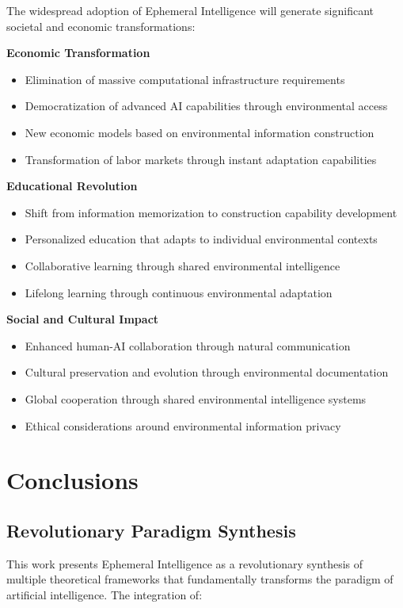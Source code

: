 \documentclass[12pt,a4paper]{article}
\begin{document}
The widespread adoption of Ephemeral Intelligence will generate significant societal and economic transformations:

\textbf{Economic Transformation}
\begin{itemize}
\item Elimination of massive computational infrastructure requirements
\item Democratization of advanced AI capabilities through environmental access
\item New economic models based on environmental information construction
\item Transformation of labor markets through instant adaptation capabilities
\end{itemize}

\textbf{Educational Revolution}
\begin{itemize}
\item Shift from information memorization to construction capability development
\item Personalized education that adapts to individual environmental contexts
\item Collaborative learning through shared environmental intelligence
\item Lifelong learning through continuous environmental adaptation
\end{itemize}

\textbf{Social and Cultural Impact}
\begin{itemize}
\item Enhanced human-AI collaboration through natural communication
\item Cultural preservation and evolution through environmental documentation
\item Global cooperation through shared environmental intelligence systems
\item Ethical considerations around environmental information privacy
\end{itemize}

\section{Conclusions}

\subsection{Revolutionary Paradigm Synthesis}

This work presents Ephemeral Intelligence as a revolutionary synthesis of multiple theoretical frameworks that fundamentally transforms the paradigm of artificial intelligence. The integration of:
\end{document}
